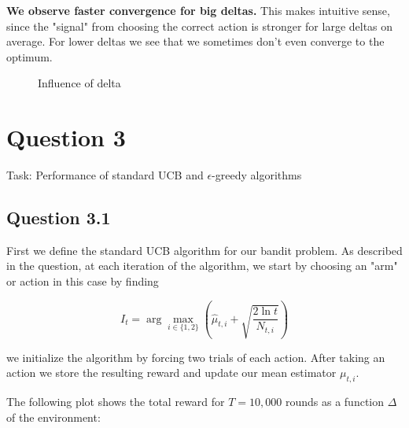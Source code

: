 \documentclass[a4paper, 11pt]{article} %
\begin{document}
\textbf{We observe faster convergence for big deltas.} This makes intuitive sense, since the "signal" from choosing the correct action is stronger for large deltas on average. For lower deltas we see that we sometimes don't even converge to the optimum.

   \begin{figure}[!htb]
        \caption{\label{fig:my-label} Influence of delta}
      \end{figure}

\clearpage

\section*{Question 3}

Task: Performance of standard UCB and $\epsilon$-greedy algorithms

\subsection*{Question 3.1}

First we define the standard UCB algorithm for our bandit problem. As described in the question, at each iteration of the algorithm, we start by choosing an "arm" or action in this case by finding

$$I_{t}=\arg \max _{i \in\{1,2\}}\left(\widehat{\mu}_{t, i}+\sqrt{\frac{2 \ln t}{N_{t, i}}}\right)$$

we initialize the algorithm by forcing two trials of each action. After taking an action we store the resulting reward and update our mean estimator $\mu_{t,i}$.

The following plot shows the total reward for $T=10,000$ rounds as a function $\Delta$ of the environment:
\end{document}
